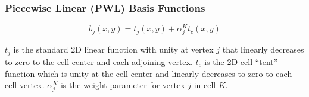 \subsubsection{Piecewise Linear (PWL) Basis Functions}
\label{sec::BF_2D_Linear_PWL}

\begin{equation}
\label{eq::PWL_2D}
	b_j (x,y) = t_j (x,y) + \alpha_j^K t_c (x,y)
\end{equation}

\noindent $t_j$ is the standard 2D linear function with unity at vertex $j$ that linearly decreases to zero to the cell center and each adjoining vertex. $t_c$ is the 2D cell ``tent'' function which is unity at the cell center and linearly decreases to zero to each cell vertex. $\alpha_{j}^{K}$ is the weight parameter for vertex $j$ in cell $K$. 



